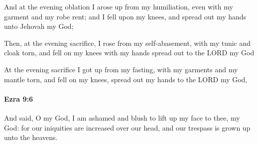 			\begin{versebox}
					\item[BHS] 
					\item[LXX] 
					\item[ASV] And at the evening oblation I arose up from my humiliation, even with my garment and my robe rent; and I fell upon my knees, and spread out my hands unto Jehovah my God;
					\item[NIV] Then, at the evening sacrifice, I rose from my self-abasement, with my tunic and cloak torn, and fell on my knees with my hands spread out to the LORD my God
					\item[NRSV] At the evening sacrifice I got up from my fasting, with my garments and my mantle torn, and fell on my knees, spread out my hands to the LORD my God,
			\end{versebox}

		\paragraph{Ezra 9:6} %
			\label{EZRA-9-6}

			And said, O my God, I am ashamed and blush to lift up my face to thee, my God: for our iniquities are increased over our head, and our trespass is grown up unto the heavens.

